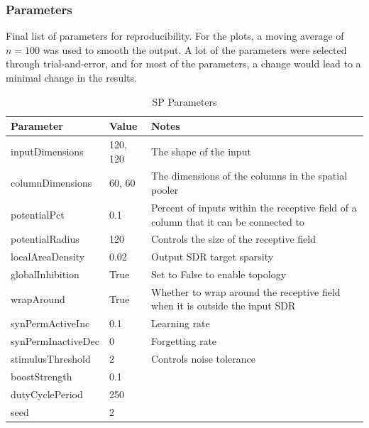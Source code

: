 \subsubsection{Parameters}
Final list of parameters for reproducibility. For the plots, a moving average of $n=100$ was used to smooth the output. A lot of the parameters were selected through trial-and-error, and for most of the parameters, a change would lead to a minimal change in the results.
\begin{table}[H]
    \centering
    \begin{tabularx}{\linewidth}{@{}llX@{}}
        \toprule
        \textbf{Parameter} & \textbf{Value} & \textbf{Notes}                                                                       \\
        \midrule
        inputDimensions    & 120, 120       & The shape of the input                                                               \\
        columnDimensions   & 60, 60         & The dimensions of the columns in the spatial pooler                                  \\
        potentialPct       & 0.1            & Percent of inputs within the receptive field of a column that it can be connected to \\
        potentialRadius    & 120            & Controls the size of the receptive field                                             \\
        localAreaDensity   & 0.02           & Output SDR target sparsity                                                           \\
        globalInhibition   & True           & Set to False to enable topology                                                      \\
        wrapAround         & True           & Whether to wrap around the receptive field when it is outside the input SDR          \\
        synPermActiveInc   & 0.1            & Learning rate                                                                        \\
        synPermInactiveDec & 0              & Forgetting rate                                                                      \\
        stimulusThreshold  & 2              & Controls noise tolerance                                                             \\
        boostStrength      & 0.1            &                                                                                      \\
        dutyCyclePeriod    & 250            &                                                                                      \\
        seed               & 2              &                                                                                      \\
        \bottomrule
    \end{tabularx}

    \caption{SP Parameters}
    \label{tab:bb_sp_params}
\end{table}
